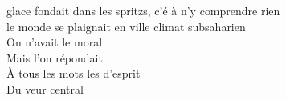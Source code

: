  glace fondait dans les spritzs, c’é à n’y comprendre rien \\
 le monde se plaignait en ville  climat subsaharien \\
On n’avait  le moral \\
Mais l’on répondait  \\

À tous les mots les  d’esprit \\
Du veur central \\

